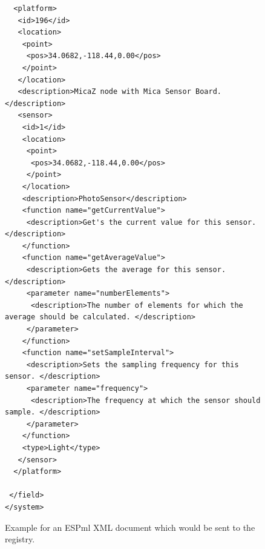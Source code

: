 \begin{figure}
\begin{lstlisting}
  <platform>
   <id>196</id>
   <location>
    <point>
     <pos>34.0682,-118.44,0.00</pos>
    </point>
   </location>
   <description>MicaZ node with Mica Sensor Board.</description>
   <sensor>
    <id>1</id>
    <location>
     <point>
      <pos>34.0682,-118.44,0.00</pos>
     </point>
    </location>
    <description>PhotoSensor</description>
    <function name="getCurrentValue">
     <description>Get's the current value for this sensor. </description>
    </function>
    <function name="getAverageValue">
     <description>Gets the average for this sensor. </description>
     <parameter name="numberElements">
      <description>The number of elements for which the average should be calculated. </description>
     </parameter>
    </function>
    <function name="setSampleInterval">
     <description>Sets the sampling frequency for this sensor. </description>
     <parameter name="frequency">
      <description>The frequency at which the sensor should sample. </description>
     </parameter>
    </function>
    <type>Light</type>
   </sensor>
  </platform>

 </field>
</system>
\end{lstlisting}
\caption{Example for an ESPml XML document which would be sent to the
registry.}
\label{fig:espml_example}
\end{figure}



